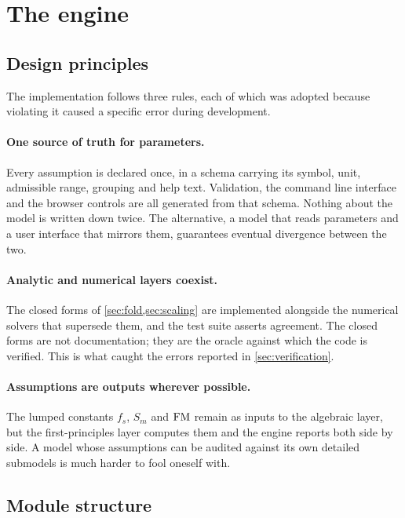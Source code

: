 ﻿\section{The engine}
\label{sec:engine}

\subsection{Design principles}

The implementation follows three rules, each of which was adopted because
violating it caused a specific error during development.

\paragraph{One source of truth for parameters.} Every assumption is declared
once, in a schema carrying its symbol, unit, admissible range, grouping and
help text. Validation, the command line interface and the browser controls are
all generated from that schema. Nothing about the model is written down twice.
The alternative, a model that reads parameters and a user interface that
mirrors them, guarantees eventual divergence between the two.

\paragraph{Analytic and numerical layers coexist.} The closed forms of
\cref{sec:fold,sec:scaling} are implemented alongside the numerical solvers
that supersede them, and the test suite asserts agreement. The closed forms are
not documentation; they are the oracle against which the code is verified. This
is what caught the errors reported in \cref{sec:verification}.

\paragraph{Assumptions are outputs wherever possible.} The lumped constants
$f_s$, $S_m$ and $\mathrm{FM}$ remain as inputs to the algebraic layer, but the
first-principles layer computes them and the engine reports both side by side.
A model whose assumptions can be audited against its own detailed submodels is
much harder to fool oneself with.

\subsection{Module structure}

